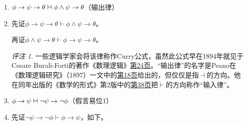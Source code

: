 \documentclass[punct=custom/kaiming,fontset=none]{ctexart}
\makeatletter
\newcommand*{\vdashv}{\mathrel{\ooalign{$\vdash$\cr\hskip1pt\reflectbox{$\vdash$}}}}
\renewenvironment{proof}[1][\proofname]{\par
  \pushQED{\qed}%
  \normalfont \topsep6\p@\@plus6\p@\relax
  \trivlist
  \item[\hskip\labelsep
    \bfseries
    #1%
    ]\ignorespaces
}{%
  \popQED\endtrivlist\@endpefalse
}
\theoremstyle{remark}
\newtheorem*{remark}{评注}
\let\proves\vdash
\makeatother
\begin{document}
\begin{description}
\begin{enumerate}
\begin{proof}
    \end{proof}
    \(\phi \to \psi \to \theta \vdashv \phi \land \psi \to \theta\)\hfill（\hypertarget{ded:exp}{输出律}）
    \begin{proof}
      先证\(\phi \to \psi \to \theta \proves \phi \land \psi \to \theta\)。
      \begin{ND}
        \label{1}
        \label{2}
        \label{3}
        \label{4}
      \end{ND}
      再证\(\phi \land \psi \to \theta \proves \phi \to \psi \to \theta\)。
      \begin{ND}
        \label{1}
        \label{2}
        \label{3}
      \end{ND}
      \begin{remark}
        一些逻辑学家会将该律称作Curry公式，虽然此公式早在1894年就见于Cesare Burali-Forti的著作《数理逻辑》\href{https://archive.org/details/BuraliFortiLogicaMatematica/page/n28/mode/1up}{第24页}。“输出律”的名字是Peano在《数理逻辑研究》（1897）一文中的\href{https://archive.org/details/peano-studii-di-logica-matematica/page/18/mode/1up}{第18页}给出的，但仅仅是指\(\dashv\)的方向。他在同年出版的《数学的形式》第2版中的\href{https://gallica.bnf.fr/ark:/12148/bpt6k84142s/f39.item}{第38页}把\(\vdash\)的方向称作“输入律”。
      \end{remark}
    \end{proof}
  \item \(\phi \to \psi \vdashv \neg\psi \to \neg\phi\)\hfill（\hypertarget{ded:contrapose1}{假言易位1}）
    \begin{proof}
      先证\(\neg\psi \to \neg\phi \proves \phi \to \psi\)，如下。
      \begin{ND}
        \label{1}
        \label{2}

\end{ND}
\end{proof}
\end{enumerate}
\end{description}
\end{document}

